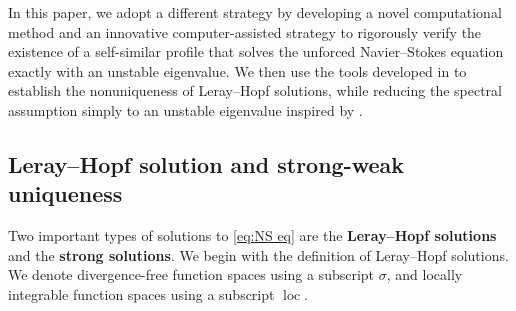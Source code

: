 \documentclass[11pt,a4paper]{article}
\numberwithin{equation}{section}
\newcommand{\tmop}[1]{\ensuremath{\operatorname{#1}}}
\newcommand{\tmstrong}[1]{\textbf{#1}}
\begin{document}
In this paper, we adopt a different strategy by developing a novel computational method and an innovative computer-assisted strategy to rigorously verify the existence of a self-similar profile that solves the unforced Navier--Stokes equation exactly with an unstable eigenvalue. We then use the tools developed in \cite{jia2015incompressible} to establish the nonuniqueness of Leray--Hopf solutions, {while reducing the spectral assumption simply to an unstable eigenvalue inspired by \cite{albritton2022non}}.   

\subsection{Leray--Hopf solution and strong-weak uniqueness}\label{subsec:ss}
Two important types of solutions to \eqref{eq:NS eq} are the {\tmstrong{Leray--Hopf solutions}} and
the {\tmstrong{strong solutions}}. We begin with the definition of Leray--Hopf
solutions.  We denote divergence-free function spaces using a subscript $\sigma$, and locally integrable function spaces using a subscript $\tmop{loc}$. 
\end{document}
